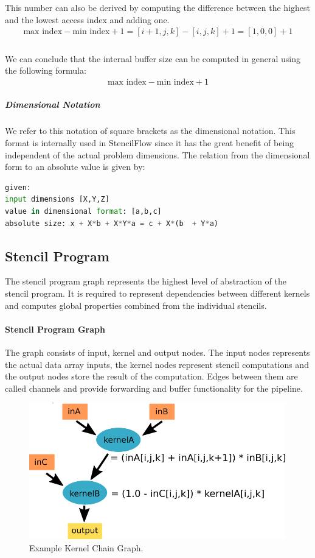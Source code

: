 This number can also be derived by computing the difference between the highest and the lowest access index and adding one. 
\begin{align}
\text{max index} - \text{min index} + 1 = [i+1, j, k] - [i, j, k] + 1 = [1, 0, 0] + 1
\end{align}


\subparagraph{}
We can conclude that the internal buffer size can be computed in general using the following formula: \\
\begin{align}
\text{max index} - \text{min index} + 1
\end{align}


\subparagraph{Dimensional Notation} 
We refer to this notation of square brackets as the dimensional notation. This format is internally used in StencilFlow since it has the great benefit of being independent of the actual problem dimensions.  
The relation from the dimensional form to an absolute value is given by:
\begin{lstlisting}[showstringspaces=false, frame=single, language=Python]  
given: 
input dimensions [X,Y,Z]   
value in dimensional format: [a,b,c]
absolute size: x + X*b + X*Y*a = c + X*(b  + Y*a)
\end{lstlisting}



\subsection{Stencil Program}
The stencil program graph represents the highest level of abstraction of the stencil program. It is required to represent dependencies between different kernels and computes global properties combined from the individual stencils.


\paragraph{Stencil Program Graph}
The graph consists of input, kernel and output nodes. The input nodes represents the actual data array inputs, the kernel nodes represent stencil computations and the output nodes store the result of the computation. Edges between them are called channels and provide forwarding and buffer functionality for the pipeline. 
\begin{figure}[h]
	\centering
	\includegraphics[height=16em]{drawings/approach-stencil-program.png}
	\caption{Example Kernel Chain Graph.}
	\label{fig:approach-stencil-program2}
\end{figure}


